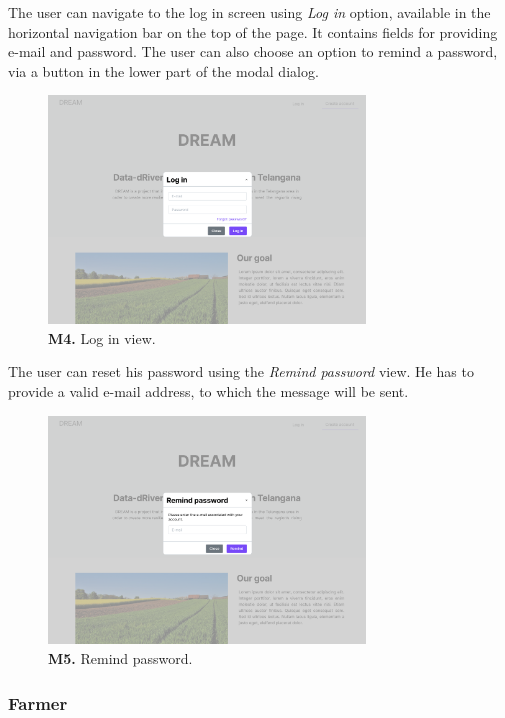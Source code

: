     The user can navigate to the log in screen using \textit{Log in} option, available in the horizontal navigation bar on the top of the page. It contains fields for providing e-mail and password. The user can also choose an option to remind a password, via a button in the lower part of the modal dialog.
    \begin{figure}[H]
        \centering
        \includegraphics[width=0.75\textwidth]{mockups/Unreg. user_Log in.png}
        \caption{\textbf{M4.} Log in view.}
        \label{fig:user-log-in}
    \end{figure}
    
    The user can reset his password using the \textit{Remind password} view. He has to provide a valid e-mail address, to which the message will be sent.
    \begin{figure}[H]
        \centering
        \includegraphics[width=0.75\textwidth]{mockups/Unreg. user_Remind password.png}
        \caption{\textbf{M5.} Remind password.}
        \label{fig:user-remind-password}
    \end{figure}
    
    
    \subsubsection{Farmer}
    
